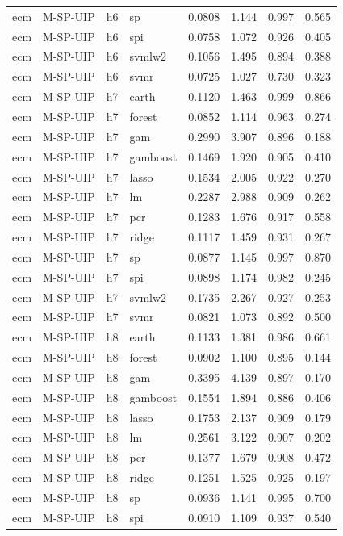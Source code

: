 \begin{ThreePartTable}
\begin{longtable}[t]{llclcccc}
ecm & M-SP-UIP & h6 & sp & 0.0808 & 1.144 & 0.997 & 0.565\\
ecm & M-SP-UIP & h6 & spi & 0.0758 & 1.072 & 0.926 & 0.405\\
ecm & M-SP-UIP & h6 & svmlw2 & 0.1056 & 1.495 & 0.894 & 0.388\\
ecm & M-SP-UIP & h6 & svmr & 0.0725 & 1.027 & 0.730 & 0.323\\
\addlinespace
ecm & M-SP-UIP & h7 & earth & 0.1120 & 1.463 & 0.999 & 0.866\\
ecm & M-SP-UIP & h7 & forest & 0.0852 & 1.114 & 0.963 & 0.274\\
ecm & M-SP-UIP & h7 & gam & 0.2990 & 3.907 & 0.896 & 0.188\\
ecm & M-SP-UIP & h7 & gamboost & 0.1469 & 1.920 & 0.905 & 0.410\\
ecm & M-SP-UIP & h7 & lasso & 0.1534 & 2.005 & 0.922 & 0.270\\
ecm & M-SP-UIP & h7 & lm & 0.2287 & 2.988 & 0.909 & 0.262\\
ecm & M-SP-UIP & h7 & pcr & 0.1283 & 1.676 & 0.917 & 0.558\\
ecm & M-SP-UIP & h7 & ridge & 0.1117 & 1.459 & 0.931 & 0.267\\
ecm & M-SP-UIP & h7 & sp & 0.0877 & 1.145 & 0.997 & 0.870\\
ecm & M-SP-UIP & h7 & spi & 0.0898 & 1.174 & 0.982 & 0.245\\
ecm & M-SP-UIP & h7 & svmlw2 & 0.1735 & 2.267 & 0.927 & 0.253\\
ecm & M-SP-UIP & h7 & svmr & 0.0821 & 1.073 & 0.892 & 0.500\\
\addlinespace
ecm & M-SP-UIP & h8 & earth & 0.1133 & 1.381 & 0.986 & 0.661\\
ecm & M-SP-UIP & h8 & forest & 0.0902 & 1.100 & 0.895 & 0.144\\
ecm & M-SP-UIP & h8 & gam & 0.3395 & 4.139 & 0.897 & 0.170\\
ecm & M-SP-UIP & h8 & gamboost & 0.1554 & 1.894 & 0.886 & 0.406\\
ecm & M-SP-UIP & h8 & lasso & 0.1753 & 2.137 & 0.909 & 0.179\\
ecm & M-SP-UIP & h8 & lm & 0.2561 & 3.122 & 0.907 & 0.202\\
ecm & M-SP-UIP & h8 & pcr & 0.1377 & 1.679 & 0.908 & 0.472\\
ecm & M-SP-UIP & h8 & ridge & 0.1251 & 1.525 & 0.925 & 0.197\\
ecm & M-SP-UIP & h8 & sp & 0.0936 & 1.141 & 0.995 & 0.700\\
ecm & M-SP-UIP & h8 & spi & 0.0910 & 1.109 & 0.937 & 0.540\\

\end{longtable}
\end{ThreePartTable}
